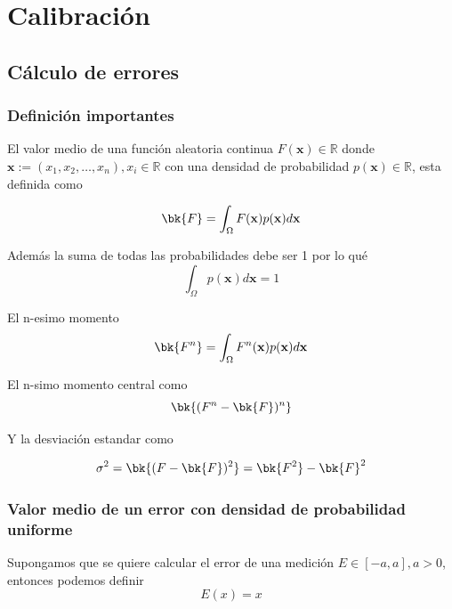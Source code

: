 \section{Calibración}

\subsection{Cálculo de errores}
\subsubsection{Definición importantes}

El valor medio de una función aleatoria continua $F(\mathbf{x})\in \mathbb{R}$ donde $\mathbf{x}:=(x_1, x_2, \ldots, x_n), x_i \in \mathbb{R}$
con una densidad de probabilidad $p(\mathbf{x})\in \mathbb{R}$,
esta definida como

\begin{equation}
  \bk{F} = \int_\Omega F(\mathbf{x}) p(\mathbf{x}) d\mathbf{x}
  \label{eq:mean}
\end{equation}

Además la suma de todas las probabilidades debe ser 1 por lo qué
\begin{equation}
  \int_\Omega p(\mathbf{x}) d\mathbf{x} = 1
  \label{eq:p-normalization}
\end{equation}

El n-esimo momento
\begin{equation}
  \bk{F^n} = \int_\Omega F^n(\mathbf{x}) p(\mathbf{x}) d\mathbf{x}
  \label{eq:moment}
\end{equation}

El n-simo momento central como
\begin{equation}
  \bk{(F^n - \bk{F})^n}
  \label{eq:n-central-momen}
\end{equation}

Y la desviación estandar como

\begin{equation}
  \sigma^2 = \bk{(F - \bk{F})^2} = \bk{F^2} - \bk{F}^2
  \label{eq:std}
\end{equation}

\subsubsection{Valor medio de un error con densidad de probabilidad uniforme}
Supongamos que se quiere calcular el error de una medición $E \in [-a, a], a > 0$,
entonces podemos definir
\begin{equation}
  E(x) = x
  \label{eq:E-error}
\end{equation}

